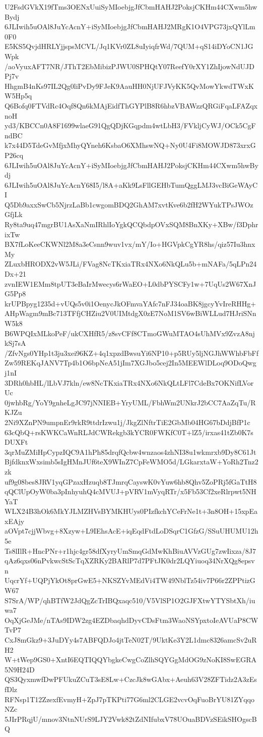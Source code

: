 U2FsdGVkX19fTms3OENxUuiSyMIoebjgJfCbmHAHJ2PoksjCKHm44CXwm5hwBydj
6JLIwih5uOAl8JuYcAcnY+iSyMIoebjgJfCbmHAHJ2MRgK1O4VPG73jxQYlLm0F0
E5KS5QvjdHRLYjjspsMCVL/Jq1KVr0ZL8uIyiqfrWd/7QUM+qS14iDYoCN1JGWpk
/aoVyuxAFT7NR/JThT2EbMibizPJWU0SPHQtY07ReefY0rXY1ZhIjowNdUJDPj7v
HhgmB4nKs97IL2Qg0liPvDy9FJeK9AauHH0NjUFJVyKK5QvMowYkwdTWxKW5Hp5q
Q6Bofq0FTVdRc4Oqf8Qn6kMAjEidfThGYPlB8R6hbzVBAWzzQRGiFqaLFAZqxnoH
yd3/KBCCn0A8F1699wlaeG91QgQDjKGqpdm4wtLbH3/FVkljCyWJ/OCk5CgFndBC
k7x44D5TdeGvMfjxMhyQYneh6KsbaO6XMhswNQ+Ny0U4Fi8MOWJD873xrxGP26cq
6JLIwih5uOAl8JuYcAcnY+iSyMIoebjgJfCbmHAHJ2PoksjCKHm44CXwm5hwBydj
6JLIwih5uOAl8JuYcAcnY68I5/l8A+aKk9LsFllGEHbTumQggLMJ3vcBiGeWAyCI
Q5Db9axxSwCb5NjrzLaBb1cwgomBDQ2GhAM7xvtKve6b2fH2WYukTPsJWOzGfjLk
Ry8ta9uq47mgrBU1AsXaNmIRhlIoYgkQCQbdpOVxSQM8BnXKy+XBw/f3DphrixTw
BX7fLoKeeCKWNl2M8a3eCsnn9wuv1vx/mY/Io+HGVpkCgYR8hs/qiz57Iu3hnxMy
ZLuxbHRODX2vW5JLi/FVag8NcTKxiaTRx4NXo6NkQLu5b+mNAFa/5qLPn24Dx+21
zvnIEW1EMm8tpUT3eBaIrMwecys6rWaEO+L0dbPYSCFy1w+7UqUs2W67XnJG5Pp8
krUPBpyg1235d+vUQs5v0i1OenycJkOFmvaYAfc7nFJ34oaBK8jgcyYvIreRHHg+
AHpWagm9mBc713TFfjCHZiu2V0UIMtdgX0zE7NoM1SV6wBiWLLud7HJriSNnW5k8
B6WPQIxMLkoPeF/ukCXHfR5/z8svCFf8CTmoGWuMTAO4sUhMVx9ZvzA8njkSj7sA
/ZfvNgs0YHp1t3ju3xei96KZ+4q1xpzdBwsuYi6NP10+p5RUy5ljNGJhWWhbFbFf
Zw59REKqJANV7Tp4b1O6bpNeA51jIm7XGJbo5cej2In5MEEWlDLoq9ODoQwgj1nI
3DRh0hbHL/lLbVJ7kln/ew8NcTKxiaTRx4NXo6NkQLtLFl7CdeBx7OKNifLVorUc
0jwhbRg/YoY9gnheLgJC97jNNIEB+YryUML/FbhWm2UNkrJ2bCC7AaZqTu/RKJZu
2Ni9XZnPN9umpnEr9rkR9ttdrIzwu1j/JkgZlNftrTiE2GbMb04HG67bDdjBfP1c
63cQbQ+rsKWKCaWnRLJdCWRekgb3kYCR0FWKfC0T+lZ5/irxas41tZb0K7sDUXFt
3qrMuZMiHpCypzIQC9A1hPh85drqfQcbw4wnzaos4zhNI38u1wkmrxb9Dy8C61Jt
BjfdknxWxsimb5sIgHMnJUf6teX9WInZ7CpFeWMO5d/LGkarxtaW+YoRh2Tnz2zk
uf9g08bes8JRV1yqGPzaxHzuqb8TJmrqCayswK0vYuw6hb8Qhv5ZoPRj5fGaTtH8
qQClUpOyW0ba3pInhyuhQ4cMVUJ+pVRV1mVyqRTr/x5Fb53Cf2xeRlrpwt5NHYaT
WLX24B3hOk6MkYJLMZHVsBYMKHUys0PIzfkchYCeFrNe1t+3n8OH+15xpEaxEAjy
aOVpt7cjjWbvg+8Xzyw+L9IEhsAcE+iqEqdFtdLoDSqrC1GfzG/SSuUHUMU12h5e
Ts8lIlR+HncPNr+r1hjc4gr58dfXyryUmSmqGdMwKhBiuAVVzGUg7zwIixza/8J7
qAz6qxs06nPvkwcStScTqXZRKy2BARlP7d7PFtJK0dr2LQYiuoq34NrXQg8epsvn
UqcrYf+UQPjYkOt8prGwE5+NKSZYvMEdVi4TW49NblTz54iv7P66r2ZPPtizGW67
S7SrA/WP/qhBTfW2JdQgZcTrIBQxaqc510/V5VlSP1O2GJFXtwYTYSbtXh/iuwa7
OqXjGeJMe/nTAs9IDW2zg4EZDbaqhdDyvCDsFtm3WaoNSYpxtoIeAVUaP8CWTvP7
CxJ8mGkz9+3JuDYy4s7ABFQDJo4jtTeN02T/9UktKe3Y2L1dmc8326amcSv2uRH2
W+tWep9GS0+XntI6EQTIQQYbgkeCwgCoZlhSQYGgMdOG9zNoKI8SwEGRA5N9H24D
QS3QyxmwfDwPFUkuZCuT3sE8Lw+CzcJk8wGAbx+Aeuh63V28ZFTidz2A3zEsfDlz
RFNsp1T12ZzexfEvmyH+ZpJ7pTKPti77G6ml2CLGE2vcvOqFuoBrYU81ZYqqoNZc
5JIrPRqjU/mnov3NtnNUrS9LJY2Vwk82tZdNIfubxV78UOuaBDVzSEikSHOgscBQ
